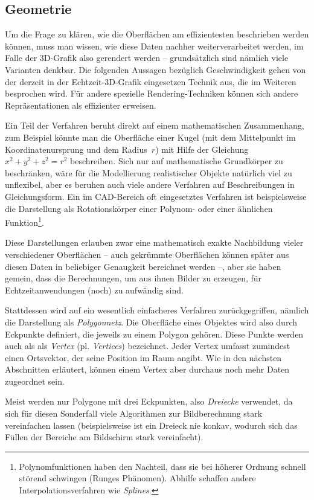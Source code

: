 \subsection{Geometrie}
\label{vertex}
Um die Frage zu klären, wie die Oberflächen am effizientesten beschrieben werden können, muss man wissen, wie diese Daten nachher weiterverarbeitet werden, im Falle der 3D-Grafik also gerendert werden -- grundsätzlich sind nämlich viele Varianten denkbar. Die folgenden Aussagen bezüglich Geschwindigkeit gehen von der derzeit in der Echtzeit-3D-Grafik eingesetzen Technik aus, die im Weiteren besprochen wird. Für andere spezielle Rendering-Techniken können sich andere Repräsentationen als effizienter erweisen.

Ein Teil der Verfahren beruht direkt auf einem mathematischen Zusammenhang, zum Beispiel könnte man die Oberfläche einer Kugel (mit dem Mittelpunkt im Koordinatenursprung und dem Radius~$r$) mit Hilfe der Gleichung $x^2 + y^2 + z^2 = r^2$ beschreiben. Sich nur auf mathematische Grundkörper zu beschränken, wäre für die Modellierung realistischer Objekte natürlich viel zu unflexibel, aber es beruhen auch viele andere Verfahren auf Beschreibungen in Gleichungsform. Ein im CAD-Bereich oft eingesetztes Verfahren ist beispielsweise die Darstellung als Rotationskörper einer Polynom- oder einer ähnlichen Funktion\footnote{Polynomfunktionen haben den Nachteil, dass sie bei höherer Ordnung schnell störend schwingen (Runges Phänomen). Abhilfe schaffen andere Interpolationsverfahren wie \emph{Splines}.}.

Diese Darstellungen erlauben zwar eine mathematisch exakte Nachbildung vieler verschiedener Oberflächen -- auch gekrümmte Oberflächen können später aus diesen Daten in beliebiger Genaugkeit bereichnet werden --, aber sie haben gemein, dass die Berechnungen, um aus ihnen Bilder zu erzeugen, für Echtzeitanwendungen (noch) zu aufwändig sind.

Stattdessen wird auf ein wesentlich einfacheres Verfahren zurückgegriffen, nämlich die Darstellung als \emph{Polygonnetz}. Die Oberfläche eines Objektes wird also durch Eckpunkte definiert, die jeweils zu einem Polygon gehören. Diese Punkte werden auch als als \emph{Vertex} (pl. \emph{Vertices}) bezeichnet. Jeder Vertex umfasst zumindest einen Ortsvektor, der seine Position im Raum angibt. Wie in den nächsten Abschnitten erläutert, können einem Vertex aber durchaus noch mehr Daten zugeordnet sein.

Meist werden nur Polygone mit drei Eckpunkten, also \emph{Dreiecke} verwendet, da sich für diesen Sonderfall viele Algorithmen zur Bildberechnung stark vereinfachen lassen (beispielsweise ist ein Dreieck nie konkav, wodurch sich das Füllen der Bereiche am Bildschirm stark vereinfacht).

